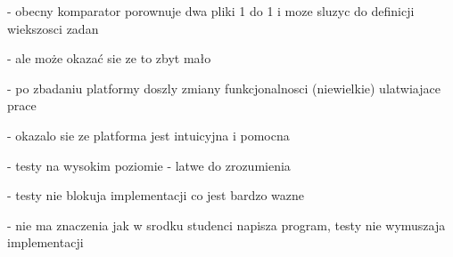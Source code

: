 - obecny komparator porownuje dwa pliki 1 do 1 i moze sluzyc do definicji wiekszosci zadan

- ale może okazać sie ze to zbyt mało

- po zbadaniu platformy doszly zmiany funkcjonalnosci (niewielkie) ulatwiajace prace

- okazalo sie ze platforma jest intuicyjna i pomocna

- testy na wysokim poziomie - latwe do zrozumienia

- testy nie blokuja implementacji co jest bardzo wazne

- nie ma znaczenia jak w srodku studenci napisza program, testy nie wymuszaja implementacji



